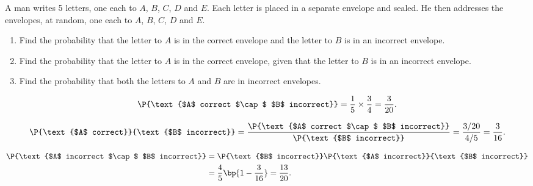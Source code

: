 \begin{problem}
    A man writes 5 letters, one each to $A$, $B$, $C$, $D$ and $E$. Each letter is placed in a separate envelope and sealed. He then addresses the envelopes, at random, one each to $A$, $B$, $C$, $D$ and $E$.
    \begin{enumerate}
        \item Find the probability that the letter to $A$ is in the correct envelope and the letter to $B$ is in an incorrect envelope.
        \item Find the probability that the letter to $A$ is in the correct envelope, given that the letter to $B$ is in an incorrect envelope.
        \item Find the probability that both the letters to $A$ and $B$ are in incorrect envelopes.
    \end{enumerate}
\end{problem}
\clearpage
\begin{solution}
    \begin{ppart}
        \[\P{\text{$A$ correct $\cap$ $B$ incorrect}} = \frac15 \times \frac34 = \frac3{20}.\]
    \end{ppart}
    \begin{ppart}
        \[\P{\text{$A$ correct}}{\text{$B$ incorrect}} = \frac{\P{\text{$A$ correct $\cap$ $B$ incorrect}}}{\P{\text{$B$ incorrect}}} = \frac{3/20}{4/5} = \frac{3}{16}.\]
    \end{ppart}
    \begin{ppart}
        \begin{align*}
            \P{\text{$A$ incorrect $\cap$ $B$ incorrect}} &= \P{\text{$B$ incorrect}} \P{\text{$A$ incorrect}}{\text{$B$ incorrect}}\\
            &= \frac45 \bp{1 - \frac3{16}} = \frac{13}{20}.
        \end{align*}
    \end{ppart}
\end{solution}

